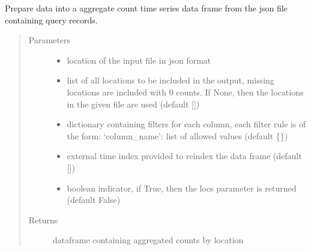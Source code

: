 \documentclass[letterpaper,10pt,english]{sphinxmanual}
\begin{document}

\begin{fulllineitems}
\label{\detokenize{manual:dnspredict.prepDataJSON}}
Prepare data into a aggregate count time series data frame from the json file containing query records.
\begin{quote}\begin{description}
\item[{Parameters}] \leavevmode\begin{itemize}
\item {} 
 \textendash{} location of the input file in json format

\item {} 
 \textendash{} list of all locations to be included in the output, missing locations are included with 0 counts. If None, then the locations in the given file are used (default \sphinxhyphen{} {[}{]})

\item {} 
 \textendash{} dictionary containing filters for each column, each filter rule is of the form: ‘column\_name’: list of allowed values (default \sphinxhyphen{} \{\})

\item {} 
 \textendash{} external time index provided to reindex the data frame (default \sphinxhyphen{} {[}{]})

\item {} 
 \textendash{} boolean indicator, if True, then the locs parameter is returned (default \sphinxhyphen{} False)

\end{itemize}

\item[{Returns}] \leavevmode
dataframe containing aggregated counts by location

\end{description}\end{quote}

\end{fulllineitems}
\end{document}
